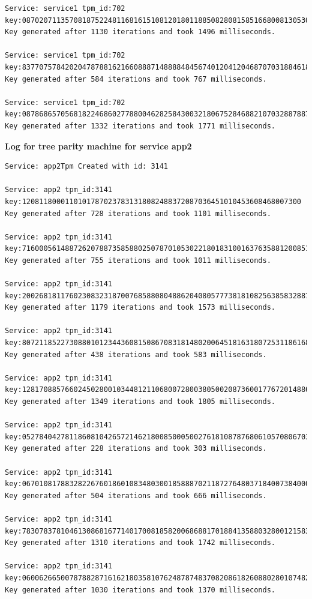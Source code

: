 \begin{lstlisting}
Service: service1 tpm_id:702 key:087020711357081875224811681615108120180118850828081585166800813053008617
Key generated after 1130 iterations and took 1496 milliseconds.

Service: service1 tpm_id:702 key:837707578420204787881621660888714888848456740120412046870703188461812188
Key generated after 584 iterations and took 767 milliseconds.

Service: service1 tpm_id:702 key:087868657056818224686027788004628258430032180675284688210703288788788008
Key generated after 1332 iterations and took 1771 milliseconds.

\end{lstlisting}

\textbf{Log for tree parity machine for service app2}
\begin{lstlisting}
Service: app2Tpm Created with id: 3141

Service: app2 tpm_id:3141 key:12081180001101017870237831318082488372087036451010453608468007300
Key generated after 728 iterations and took 1101 milliseconds.

Service: app2 tpm_id:3141 key:716000561488726207887358588025078701053022180183100163763588120085187605
Key generated after 755 iterations and took 1011 milliseconds.

Service: app2 tpm_id:3141 key:200268181176023083231870076858808048862040805777381810825638583288780080
Key generated after 1179 iterations and took 1573 milliseconds.

Service: app2 tpm_id:3141 key:807211852273088010123443608150867083181480200645181631807253118616808110
Key generated after 438 iterations and took 583 milliseconds.

Service: app2 tpm_id:3141 key:128170885766024502800103448121106800728003805002087360017767201488625782
Key generated after 1349 iterations and took 1805 milliseconds.

Service: app2 tpm_id:3141 key:052784042781186081042657214621800850005002761810878768061057080670346023
Key generated after 228 iterations and took 303 milliseconds.

Service: app2 tpm_id:3141 key:067010817883282267601860108348030018588870211872764803718400738400010533
Key generated after 504 iterations and took 666 milliseconds.

Service: app2 tpm_id:3141 key:783078378104613086816771401700818582006868817018841358803280012158381870
Key generated after 1310 iterations and took 1742 milliseconds.

Service: app2 tpm_id:3141 key:060062665007878828716162180358107624878748370820861826088028010748217341
Key generated after 1030 iterations and took 1370 milliseconds.


\end{lstlisting}

